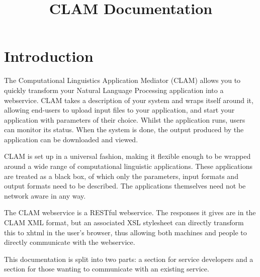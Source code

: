 \title{CLAM Documentation}




\section{Introduction} 

The Computational Linguistics Application Mediator (CLAM) allows you to quickly transform your
Natural Language Processing application into a webservice. CLAM takes a description of your system and wraps itself around it, allowing end-users to upload input files to your application, and start your application with  parameters of their choice. Whilst the application runs, users can monitor its status. When the system is done, the output produced by the application can be downloaded and viewed.

CLAM is set up in a universal fashion, making it flexible enough to be wrapped around a wide range of computational linguistic applications. These applications are treated as a black box, of which only the parameters, input formats and output formats need to be described. The applications themselves need not be network aware in any way.

The CLAM webservice is a RESTful webservice. The responses it gives are in the CLAM XML format, but an associated XSL stylesheet can directly transform this to xhtml in the user's browser, thus allowing both machines and people to directly communicate with the webservice.

This documentation is split into two parts: a section for service developers and a section for those wanting to communicate with an existing service.


